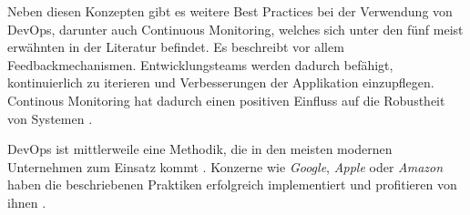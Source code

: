 Neben diesen Konzepten gibt es weitere Best Practices bei der Verwendung von DevOps, darunter auch Continuous Monitoring, welches sich unter den fünf meist erwähnten in der Literatur befindet. Es beschreibt vor allem Feedbackmechanismen. Entwicklungsteams werden dadurch befähigt, kontinuierlich zu iterieren und Verbesserungen der Applikation einzupflegen. Continous Monitoring hat dadurch einen positiven Einfluss auf die Robustheit von Systemen \cite{012:Compare-and-Contrast-various-Software-Development-Methodologies}.

DevOps ist mittlerweile eine Methodik, die in den meisten modernen Unternehmen zum Einsatz kommt \cite{020:Assessing-and-Improving-Quality-of-Docker-Artifacts}. Konzerne wie \textit{Google}, \textit{Apple} oder \textit{Amazon} haben die beschriebenen Praktiken erfolgreich implementiert und profitieren von ihnen \cite{001:DevOps-Adoption-in-Software-Development}.
